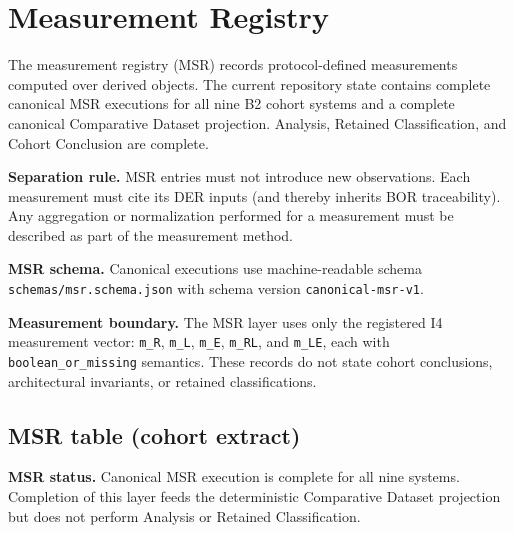 \section{Measurement Registry}
\label{sec:msr}
The measurement registry (MSR) records protocol-defined measurements computed over derived objects. The current repository state contains complete canonical MSR executions for all nine B2 cohort systems and a complete canonical Comparative Dataset projection. Analysis, Retained Classification, and Cohort Conclusion are complete.

\textbf{Separation rule.} MSR entries must not introduce new observations. Each measurement must cite its DER inputs (and thereby inherits BOR traceability). Any aggregation or normalization performed for a measurement must be described as part of the measurement method.

\textbf{MSR schema.} Canonical executions use machine-readable schema \texttt{schemas/msr.schema.json} with schema version \texttt{canonical-msr-v1}.

\textbf{Measurement boundary.} The MSR layer uses only the registered I4 measurement vector: \texttt{m\_R}, \texttt{m\_L}, \texttt{m\_E}, \texttt{m\_RL}, and \texttt{m\_LE}, each with \texttt{boolean\_or\_missing} semantics. These records do not state cohort conclusions, architectural invariants, or retained classifications.

\subsection{MSR table (cohort extract)}
\textbf{MSR status.} Canonical MSR execution is complete for all nine systems. Completion of this layer feeds the deterministic Comparative Dataset projection but does not perform Analysis or Retained Classification.

